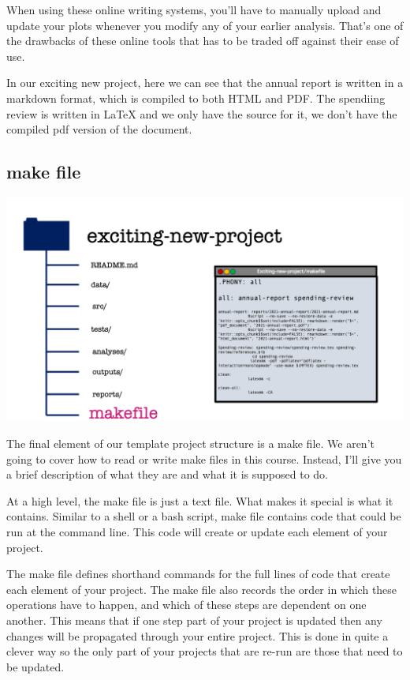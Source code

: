 \documentclass[
  12pt,
]{book}
\begin{document}
When using these online writing systems, you'll have to manually upload and update your plots whenever you modify any of your earlier analysis. That's one of the drawbacks of these online tools that has to be traded off against their ease of use.

In our exciting new project, here we can see that the annual report is written in a markdown format, which is compiled to both HTML and PDF. The spendiing review is written in LaTeX and we only have the source for it, we don't have the compiled pdf version of the document.

\hypertarget{make-file}{%
\subsection{make file}\label{make-file}}

\includegraphics[width=0.8\linewidth]{images/101-workflows-organising-your-work/directory-structure-drawings/directory-structure-drawing-32}

The final element of our template project structure is a make file. We aren't going to cover how to read or write make files in this course. Instead, I'll give you a brief description of what they are and what it is supposed to do.

At a high level, the make file is just a text file. What makes it special is what it contains. Similar to a shell or a bash script, make file contains code that could be run at the command line. This code will create or update each element of your project.

The make file defines shorthand commands for the full lines of code that create each element of your project. The make file also records the order in which these operations have to happen, and which of these steps are dependent on one another. This means that if one step part of your project is updated then any changes will be propagated through your entire project. This is done in quite a clever way so the only part of your projects that are re-run are those that need to be updated.
\end{document}
